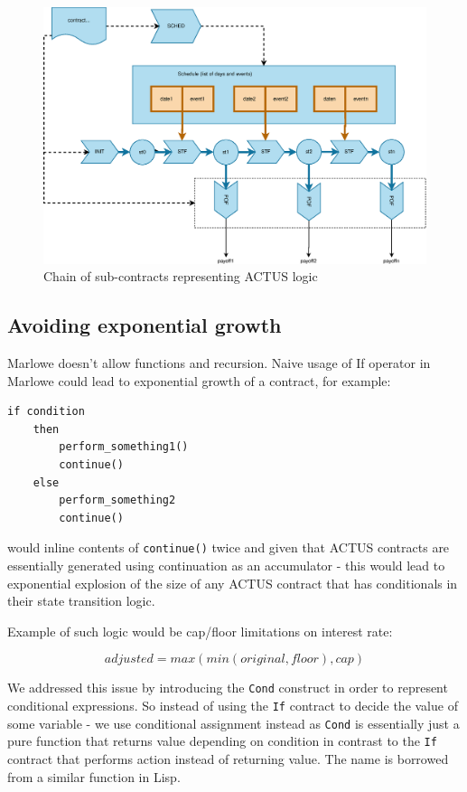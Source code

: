 \documentclass[runningheads]{llncs}
\begin{document}
\begin{figure}
\includegraphics[width=1\textwidth]{images/flowchart} \caption{Chain of sub-contracts representing ACTUS logic}
\label{fig2} 
\end{figure}


\subsection{Avoiding exponential growth }

Marlowe doesn't allow functions and recursion. Naive usage of If operator
in Marlowe could lead to exponential growth of a contract, for example:

\begin{verbatim}
if condition 
	then 
		perform_something1()
		continue() 
	else 
		perform_something2 
		continue()
\end{verbatim}
\noindent
would inline contents of \texttt{continue()} twice and given that ACTUS
contracts are essentially generated using continuation as an accumulator
- this would lead to exponential explosion of the size of any ACTUS
contract that has conditionals in their state transition logic.

Example of such logic would be cap/floor limitations on interest rate:

\noindent 
\begin{equation}
adjusted=max(min(original,floor),cap)
\end{equation}

We addressed this issue by introducing the \texttt{Cond} construct in order
to represent conditional expressions. So instead of using the \texttt{If}
contract to decide the value of some variable - we use conditional
assignment instead as \texttt{Cond} is essentially just a pure function
that returns value depending on condition in contrast to the \texttt{If}
contract that performs action instead of returning value. The name
is borrowed from a similar function in Lisp.
\end{document}
